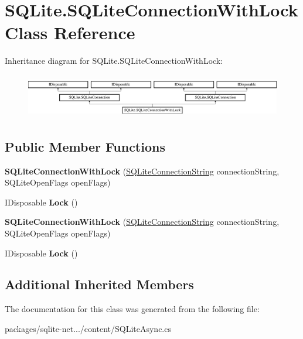 \hypertarget{classSQLite_1_1SQLiteConnectionWithLock}{\section{S\-Q\-Lite.\-S\-Q\-Lite\-Connection\-With\-Lock Class Reference}
\label{classSQLite_1_1SQLiteConnectionWithLock}
}
Inheritance diagram for S\-Q\-Lite.\-S\-Q\-Lite\-Connection\-With\-Lock\-:\begin{figure}[H]
\begin{center}
\leavevmode
\includegraphics[height=1.953488cm]{classSQLite_1_1SQLiteConnectionWithLock}
\end{center}
\end{figure}
\subsection*{Public Member Functions}
\begin{DoxyCompactItemize}
\item 
\hypertarget{classSQLite_1_1SQLiteConnectionWithLock_ad30600291e3accc913d7bc2818f24d3b}{{\bfseries S\-Q\-Lite\-Connection\-With\-Lock} (\hyperlink{classSQLite_1_1SQLiteConnectionString}{S\-Q\-Lite\-Connection\-String} connection\-String, S\-Q\-Lite\-Open\-Flags open\-Flags)}\label{classSQLite_1_1SQLiteConnectionWithLock_ad30600291e3accc913d7bc2818f24d3b}

\item 
\hypertarget{classSQLite_1_1SQLiteConnectionWithLock_ad38e795a2b94ecd709b9b60e2c4d3e4e}{I\-Disposable {\bfseries Lock} ()}\label{classSQLite_1_1SQLiteConnectionWithLock_ad38e795a2b94ecd709b9b60e2c4d3e4e}

\item 
\hypertarget{classSQLite_1_1SQLiteConnectionWithLock_ad30600291e3accc913d7bc2818f24d3b}{{\bfseries S\-Q\-Lite\-Connection\-With\-Lock} (\hyperlink{classSQLite_1_1SQLiteConnectionString}{S\-Q\-Lite\-Connection\-String} connection\-String, S\-Q\-Lite\-Open\-Flags open\-Flags)}\label{classSQLite_1_1SQLiteConnectionWithLock_ad30600291e3accc913d7bc2818f24d3b}

\item 
\hypertarget{classSQLite_1_1SQLiteConnectionWithLock_ad38e795a2b94ecd709b9b60e2c4d3e4e}{I\-Disposable {\bfseries Lock} ()}\label{classSQLite_1_1SQLiteConnectionWithLock_ad38e795a2b94ecd709b9b60e2c4d3e4e}

\end{DoxyCompactItemize}
\subsection*{Additional Inherited Members}


The documentation for this class was generated from the following file\-:\begin{DoxyCompactItemize}
\item 
packages/sqlite-\/net.../content/S\-Q\-Lite\-Async.\-cs\end{DoxyCompactItemize}
